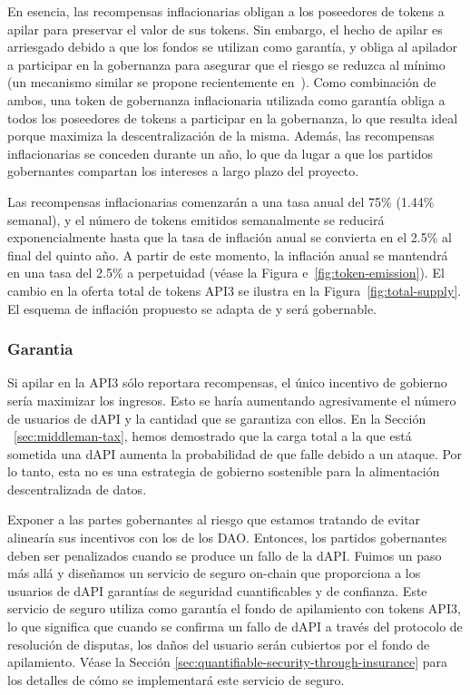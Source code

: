 \documentclass[11pt]{article}
\begin{document}
En esencia, las recompensas inflacionarias obligan a los poseedores de tokens a apilar para preservar el valor de sus tokens. Sin embargo, el hecho de apilar es arriesgado debido a que los fondos se utilizan como garantía, y obliga al apilador a participar en la gobernanza para asegurar que el riesgo se reduzca al mínimo (un mecanismo similar se propone recientemente en~\cite{aave}).
Como combinación de ambos, una token de gobernanza inflacionaria utilizada como garantía obliga a todos los poseedores de tokens a participar en la gobernanza, lo que resulta ideal porque maximiza la descentralización de la misma. Además, las recompensas inflacionarias se conceden durante un año, lo que da lugar a que los partidos gobernantes compartan los intereses a largo plazo del proyecto.

Las recompensas inflacionarias comenzarán a una tasa anual del  75\% (1.44\% semanal), y el número de tokens emitidos semanalmente se reducirá exponencialmente hasta que la tasa de inflación anual se convierta en el  2.5\% al final del quinto año. A partir de este momento, la inflación anual se mantendrá en una tasa del 2.5\% a perpetuidad (véase la Figura e~\ref{fig:token-emission}).
El cambio en la oferta total de tokens API3 se ilustra en la Figura~\ref{fig:total-supply}.
El esquema de inflación propuesto se adapta de\cite{sip-24} y será gobernable.

\subsubsection{Garantia}
\label{sec:collateral}

Si apilar en la API3 sólo reportara recompensas, el único incentivo de gobierno sería maximizar los ingresos. Esto se haría aumentando agresivamente el número de usuarios de dAPI y la cantidad que se garantiza con ellos. En la Sección ~\ref{sec:middleman-tax}, hemos demostrado que la carga total a la que está sometida una dAPI aumenta la probabilidad de que falle debido a un ataque. Por lo tanto, esta no es una estrategia de gobierno sostenible para la alimentación descentralizada de datos.

Exponer a las partes gobernantes al riesgo que estamos tratando de evitar alinearía sus incentivos con los de los DAO. Entonces, los partidos gobernantes deben ser penalizados cuando se produce un fallo de la dAPI. Fuimos un paso más allá y diseñamos un servicio de seguro on-chain que proporciona a los usuarios de dAPI garantías de seguridad cuantificables y de confianza. Este servicio de seguro utiliza como garantía el fondo de apilamiento con tokens API3, lo que significa que cuando se confirma un fallo de dAPI a través del protocolo de resolución de disputas, los daños del usuario serán cubiertos por el fondo de apilamiento. Véase la Sección \ref{sec:quantifiable-security-through-insurance} para los detalles de cómo se implementará este servicio de seguro. 
\end{document}
